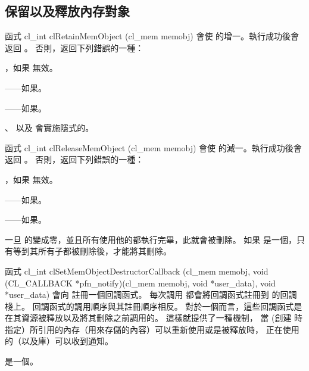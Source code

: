 \subsection{保留以及釋放內存對象}

函式
\startCLFUNC
cl_int clRetainMemObject (cl_mem memobj)
\stopCLFUNC
會使  的增一。執行成功後會返回 。
否則，返回下列錯誤的一種：
\startigBase
\item {}，如果  無效。

\item {}——如果\scdevfailres。

\item {}——如果\schostfailres。
\stopigBase

、  以及  會實施隱式的。

函式
\startCLFUNC
cl_int clReleaseMemObject (cl_mem memobj)
\stopCLFUNC
會使  的減一。執行成功後會返回 。
否則，返回下列錯誤的一種：
\startigBase
\item {}，如果  無效。

\item {}——如果\scdevfailres。

\item {}——如果\schostfailres。
\stopigBase

一旦  的變成零，並且所有使用他的都執行完畢，此就會被刪除。
如果  是一個，只有等到其所有子都被刪除後，才能將其刪除。

函式
\startCLFUNC
cl_int clSetMemObjectDestructorCallback (cl_mem memobj,
		void (CL_CALLBACK *pfn_notify)(cl_mem memobj,
			void *user_data),
		void *user_data)
\stopCLFUNC
會向  註冊一個回調函式。
每次調用  都會將回調函式註冊到  的回調棧上。
回調函式的調用順序與其註冊順序相反。
對於一個而言，這些回調函式是在其資源被釋放以及將其刪除之前調用的。
這樣就提供了一種機制，
當  (創建  時指定）所引用的內存（用來存儲的內容）可以重新使用或是被釋放時，
正在使用  的（以及庫）可以收到通知。

 是一個。

